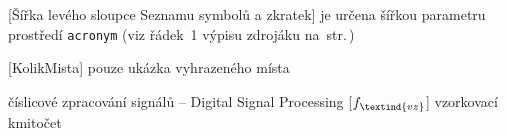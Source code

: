 \cleardoublepage
\chapter*{\listofabbrevname}
{}

\begin{acronym}[KolikMista]

		[Šířka levého sloupce Seznamu symbolů a zkratek]								%
		{je určena šířkou parametru prostředí \texttt{acronym} (viz řádek~1 výpisu zdrojáku na~str.\,\pageref{lst:zkratky})}

		[KolikMista]
		{pouze ukázka vyhrazeného místa}

		{číslicové zpracování signálů -- Digital Signal Processing}
		[\ensuremath{f_\textind{vz}}] %
		{vzorkovací kmitočet}					%

\end{acronym}
